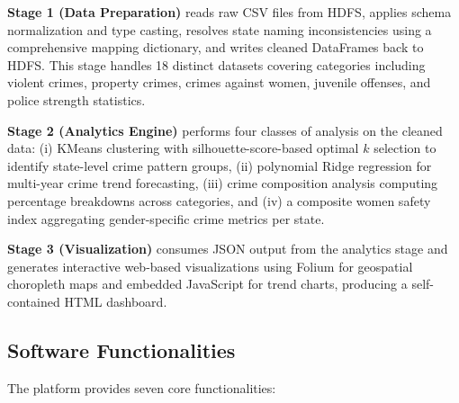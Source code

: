 \documentclass[a4paper,12pt]{article}
\begin{document}
\textbf{Stage 1 (Data Preparation)} reads raw CSV files from HDFS, applies schema normalization and type casting, resolves state naming inconsistencies using a comprehensive mapping dictionary, and writes cleaned DataFrames back to HDFS. This stage handles 18 distinct datasets covering categories including violent crimes, property crimes, crimes against women, juvenile offenses, and police strength statistics.

\textbf{Stage 2 (Analytics Engine)} performs four classes of analysis on the cleaned data: (i) KMeans clustering with silhouette-score-based optimal $k$ selection \cite{rousseeuw1987} to identify state-level crime pattern groups, (ii) polynomial Ridge regression \cite{hoerl1970} for multi-year crime trend forecasting, (iii) crime composition analysis computing percentage breakdowns across categories, and (iv) a composite women safety index aggregating gender-specific crime metrics per state.

\textbf{Stage 3 (Visualization)} consumes JSON output from the analytics stage and generates interactive web-based visualizations using Folium \cite{folium2023} for geospatial choropleth maps and embedded JavaScript for trend charts, producing a self-contained HTML dashboard.

\subsection{Software Functionalities}

The platform provides seven core functionalities:
\end{document}
